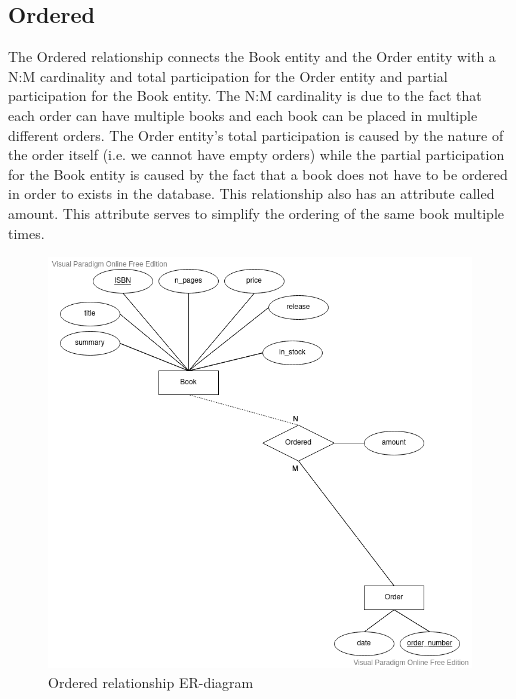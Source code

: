 \documentclass[fleqn]{scrreprt}
\begin{document}
\subsection{Ordered}
The Ordered relationship connects the Book entity and the Order entity with
a N:M cardinality and total participation for the Order entity and partial
participation for the Book entity. The N:M cardinality is due to the fact that
each order can have multiple books and each book can be placed in multiple
different orders. The Order entity's total participation is caused by the nature
of the order itself (i.e. we cannot have empty orders) while the partial participation
for the Book entity is caused by the fact that a book does not have to be ordered
in order to exists in the database. This relationship also has an attribute
called amount. This attribute serves to simplify the ordering of the same
book multiple times.
\begin{figure}[h]\centering
    \includegraphics[width=.6\columnwidth]{er-diagram-project-Ordered.vpd.png}
    \caption{Ordered relationship ER-diagram}\label{fig:ero}
\end{figure}
\end{document}
